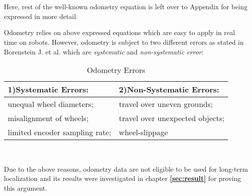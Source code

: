 \\
\\
Here, rest of the well-known odometry equation is left over to Appendix for being expressed in more detail.
\\ 
\par Odometry relies on above expressed equations which are easy to apply in real time on robots. However, odometry is subject to two different errors as stated in Borenstein J. et al. \cite{odometry1} which are \textit{systematic} and \textit{non-systematic error}:
\begin{table}[h!]
\renewcommand{\arraystretch}{2}
    \centering
    \begin{tabular}{| l | l |}
    \hline
        1)Systematic Errors:            &2)Non-Systematic Errors:\\
    \hline
        unequal wheel diameters;        &travel over uneven grounds;\\
        misalignment of wheels;         &travel over unexpected objects;\\
        limited encoder sampling rate;  &wheel-slippage\\
    \hline
    \end{tabular}
\caption{Odometry Errors}
\label{lab:Odom_error}
\end{table}
\\
\par Due to the above reasons, odometry data are not eligible to be used for long-term localization and its results were investigated in chapter \textbf{\ref{sec:result}} for proving this argument.
\newpage
